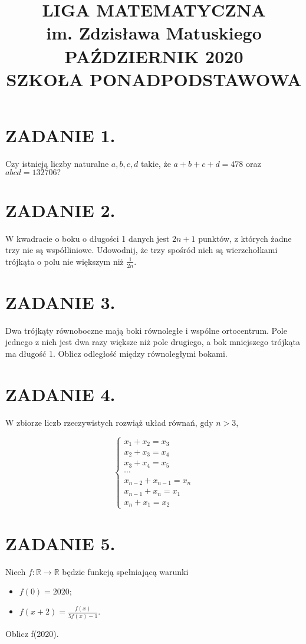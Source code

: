 \documentclass[10pt]{article}
\title{LIGA MATEMATYCZNA \\
 im. Zdzisława Matuskiego \\
 PAŹDZIERNIK 2020 \\
 SZKOŁA PONADPODSTAWOWA }
\author{}
\date{}
\begin{document}
\maketitle
\section*{ZADANIE 1.}
Czy istnieją liczby naturalne \(a, b, c, d\) takie, że \(a+b+c+d=478\) oraz \(a b c d=132706 ?\)

\section*{ZADANIE 2.}
W kwadracie o boku o długości 1 danych jest \(2 n+1\) punktów, z których żadne trzy nie są współliniowe. Udowodnij, że trzy spośród nich są wierzchołkami trójkąta o polu nie większym niż \(\frac{1}{2 n}\).

\section*{ZADANIE 3.}
Dwa trójkąty równoboczne mają boki równoległe i wspólne ortocentrum. Pole jednego z nich jest dwa razy większe niż pole drugiego, a bok mniejszego trójkąta ma długość 1. Oblicz odległość między równoległymi bokami.

\section*{ZADANIE 4.}
W zbiorze liczb rzeczywistych rozwiąż układ równań, gdy \(n>3\),

\[
\left\{\begin{array}{l}
x_{1}+x_{2}=x_{3} \\
x_{2}+x_{3}=x_{4} \\
x_{3}+x_{4}=x_{5} \\
\cdots \\
x_{n-2}+x_{n-1}=x_{n} \\
x_{n-1}+x_{n}=x_{1} \\
x_{n}+x_{1}=x_{2}
\end{array}\right.
\]

\section*{ZADANIE 5.}
Niech \(f: \mathbb{R} \rightarrow \mathbb{R}\) będzie funkcją spełniającą warunki

\begin{itemize}
  \item \(f(0)=2020\);
  \item \(f(x+2)=\frac{f(x)}{5 f(x)-1}\).
\end{itemize}

Oblicz f(2020).
\end{document}
